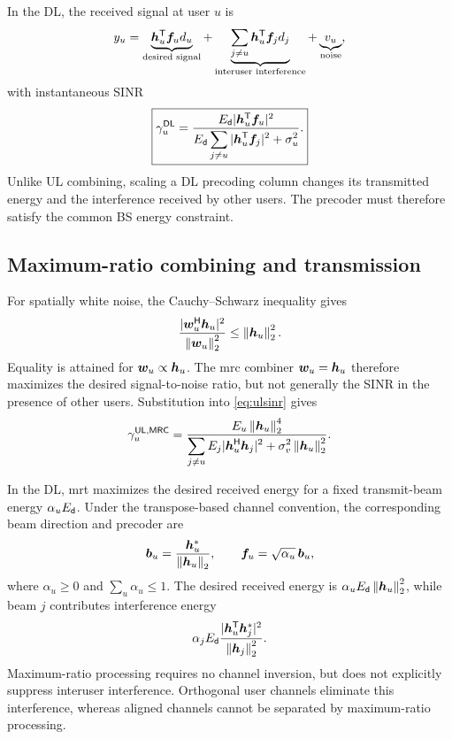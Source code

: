 In the DL, the received signal at user $u$ is
\begin{equation*}
	y_u=
	\underbrace{{\bm{h}}^{\mathsf{T}}_u\bm{f}_u d_u}_{\text{desired signal}}
	+\underbrace{\sum_{j\ne u}{\bm{h}}^{\mathsf{T}}_u\bm{f}_jd_j}_{\text{interuser interference}}
	+\underbrace{v_u}_{\text{noise}},
\end{equation*}
with instantaneous SINR
\begin{equation}
	\boxed{
		\gamma_u^{\mathsf{DL}}=
		\frac{E_{\mathsf{d}}|{\bm{h}}^{\mathsf{T}}_u\bm{f}_u|^2}
		{\displaystyle E_{\mathsf{d}}\sum_{j\ne u}|{\bm{h}}^{\mathsf{T}}_u\bm{f}_j|^2+\sigma_u^2}.
	}
	\label{eq:dlsinr}
\end{equation}
Unlike UL combining, scaling a DL precoding column changes its transmitted energy and the interference received by other users. The precoder must therefore satisfy the common BS energy constraint.

\subsection{Maximum-ratio combining and transmission}
For spatially white noise, the Cauchy--Schwarz inequality gives
\begin{equation*}
	\frac{|{\bm{w}}^{\mathsf{H}}_u\bm{h}_u|^2}{\left\|\bm{w}_u\right\|_2^2}
	\leq\left\|\bm{h}_u\right\|_2^2.
\end{equation*}
Equality is attained for $\bm{w}_u\propto\bm{h}_u$. The \ac{mrc} combiner $\bm{w}_u=\bm{h}_u$ therefore maximizes the desired signal-to-noise ratio, but not generally the SINR in the presence of other users. Substitution into \eqref{eq:ulsinr} gives
\begin{equation}
	\gamma_u^{\mathsf{UL},\mathsf{MRC}}
	=\frac{E_u\left\|\bm{h}_u\right\|_2^4}
	{\displaystyle\sum_{j\ne u}E_j|{\bm{h}}^{\mathsf{H}}_u\bm{h}_j|^2+
		\sigma_v^2\left\|\bm{h}_u\right\|_2^2}.
	\label{eq:mrc}
\end{equation}

In the DL, \ac{mrt} maximizes the desired received energy for a fixed transmit-beam energy $\alpha_u E_{\mathsf{d}}$. Under the transpose-based channel convention, the corresponding beam direction and precoder are
\begin{equation*}
	\bm{b}_u=\frac{\bm{h}_u^*}{\left\|\bm{h}_u\right\|_2},
	\qquad
	\bm{f}_u=\sqrt{\alpha_u}\,\bm{b}_u,
\end{equation*}
where $\alpha_u\geq0$ and $\sum_u \alpha_u\leq1$. The desired received energy is $\alpha_uE_{\mathsf{d}}\left\|\bm{h}_u\right\|_2^2$, while beam $j$ contributes interference energy
\begin{equation*}
	\alpha_jE_{\mathsf{d}}\frac{|{\bm{h}}^{\mathsf{T}}_u\bm{h}_j^*|^2}
	{\left\|\bm{h}_j\right\|_2^2}.
\end{equation*}
Maximum-ratio processing requires no channel inversion, but does not explicitly suppress interuser interference. Orthogonal user channels eliminate this interference, whereas aligned channels cannot be separated by maximum-ratio processing.

